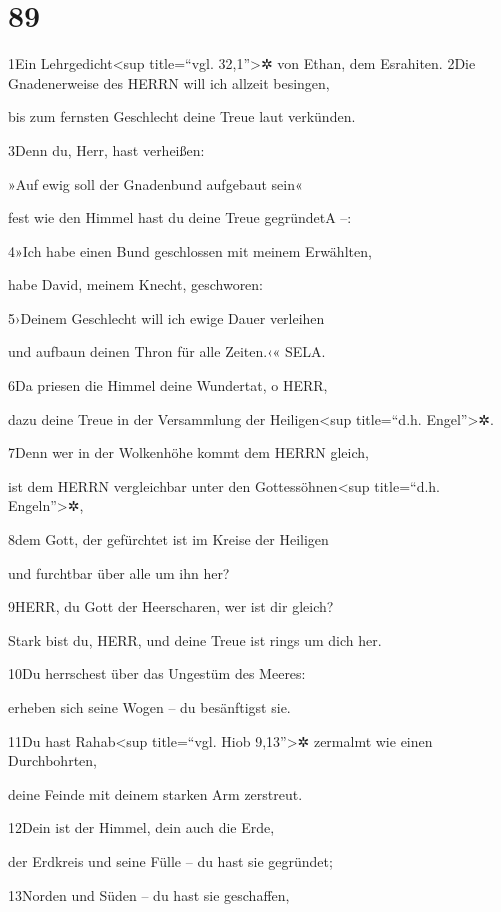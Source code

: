 \hypertarget{section-88}{%
\section{89}\label{section-88}}

1Ein Lehrgedicht\textless sup title=``vgl. 32,1''\textgreater✲ von
Ethan, dem Esrahiten. 2Die Gnadenerweise des HERRN will ich allzeit
besingen,

bis zum fernsten Geschlecht deine Treue laut verkünden.

3Denn du, Herr, hast verheißen:

»Auf ewig soll der Gnadenbund aufgebaut sein«

fest wie den Himmel hast du deine Treue gegründet{A} --:

4»Ich habe einen Bund geschlossen mit meinem Erwählten,

habe David, meinem Knecht, geschworen:

5›Deinem Geschlecht will ich ewige Dauer verleihen

und aufbaun deinen Thron für alle Zeiten.‹« SELA.

6Da priesen die Himmel deine Wundertat, o HERR,

dazu deine Treue in der Versammlung der Heiligen\textless sup
title=``d.h. Engel''\textgreater✲.

7Denn wer in der Wolkenhöhe kommt dem HERRN gleich,

ist dem HERRN vergleichbar unter den Gottessöhnen\textless sup
title=``d.h. Engeln''\textgreater✲,

8dem Gott, der gefürchtet ist im Kreise der Heiligen

und furchtbar über alle um ihn her?

9HERR, du Gott der Heerscharen, wer ist dir gleich?

Stark bist du, HERR, und deine Treue ist rings um dich her.

10Du herrschest über das Ungestüm des Meeres:

erheben sich seine Wogen -- du besänftigst sie.

11Du hast Rahab\textless sup title=``vgl. Hiob 9,13''\textgreater✲
zermalmt wie einen Durchbohrten,

deine Feinde mit deinem starken Arm zerstreut.

12Dein ist der Himmel, dein auch die Erde,

der Erdkreis und seine Fülle -- du hast sie gegründet;

13Norden und Süden -- du hast sie geschaffen,

